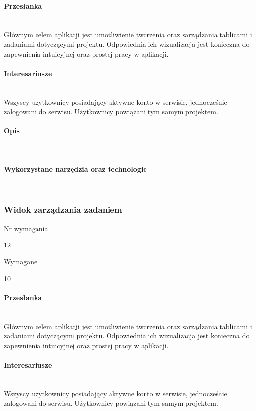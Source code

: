 \documentclass[eng,printmode]{mgr}
\begin{document}
\paragraph{Przesłanka}\ \\
Głównym celem aplikacji jest umożliwienie tworzenia oraz zarządzania tablicami i zadaniami dotyczącymi projektu. Odpowiednia ich wizualizacja jest konieczna do zapewnienia intuicyjnej oraz prostej pracy w aplikacji.

\paragraph{Interesariusze}\ \\
Wszyscy użytkownicy posiadający aktywne konto w serwisie, jednocześnie zalogowani do serwisu. Użytkownicy powiązani tym samym projektem.

\paragraph{Opis}\ \\

\paragraph{Wykorzystane narzędzia oraz technologie}\ \\
\newpage

\subsubsection{Widok zarządzania zadaniem}
\begin{labeling}{Nr wymagania}
\item [Nr wymagania:] 12
\item [Typ:] Wymagane
\item [Powiązania:] 10
\end{labeling}
\paragraph{Przesłanka}\ \\
Głównym celem aplikacji jest umożliwienie tworzenia oraz zarządzania tablicami i zadaniami dotyczącymi projektu. Odpowiednia ich wizualizacja jest konieczna do zapewnienia intuicyjnej oraz prostej pracy w aplikacji.

\paragraph{Interesariusze}\ \\
Wszyscy użytkownicy posiadający aktywne konto w serwisie, jednocześnie zalogowani do serwisu. Użytkownicy powiązani tym samym projektem.
\end{document}
